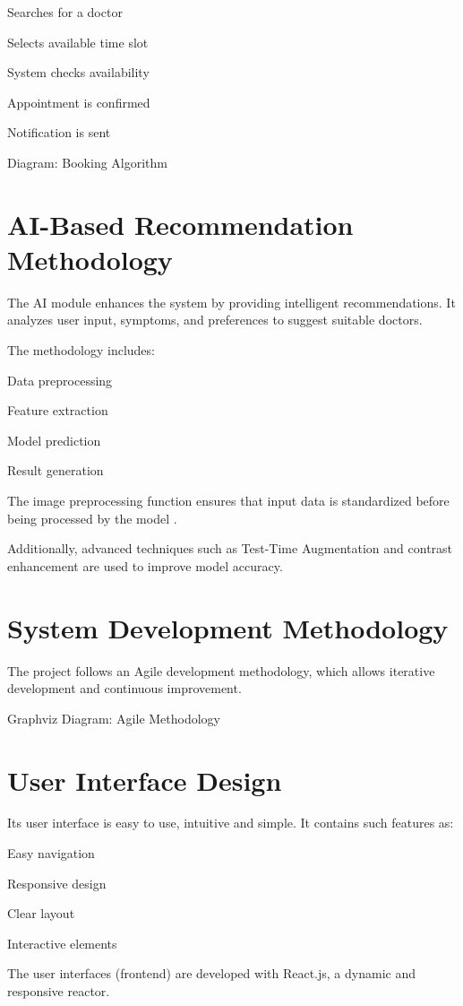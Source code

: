 Searches for a doctor

Selects available time slot

System checks availability

Appointment is confirmed

Notification is sent

Diagram: Booking Algorithm

\section{AI-Based Recommendation Methodology}

The AI module enhances the system by providing intelligent recommendations. It analyzes user input, symptoms, and preferences to suggest suitable doctors.

The methodology includes:

Data preprocessing

Feature extraction

Model prediction

Result generation

The image preprocessing function ensures that input data is standardized before being processed by the model .

Additionally, advanced techniques such as Test-Time Augmentation and contrast enhancement are used to improve model accuracy.

\section{System Development Methodology}

The project follows an Agile development methodology, which allows iterative development and continuous improvement.

Graphviz Diagram: Agile Methodology

\section{User Interface Design}

Its user interface is easy to use, intuitive and simple. It contains such features as:

Easy navigation

Responsive design

Clear layout

Interactive elements

The user interfaces (frontend) are developed with React.js, a dynamic and responsive reactor.

